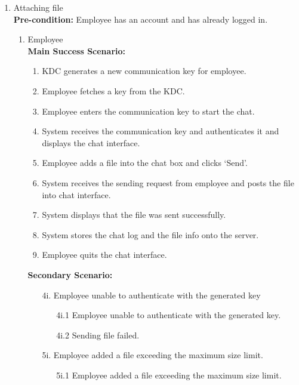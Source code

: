 \documentclass[]{article}
\begin{document}
\begin{enumerate}[{\bf BE1.}]
\begin{enumerate}[{\bf BE7.}]
	\item Attaching file  \\
        \textbf{Pre-condition:} Employee has an account and has already logged in.
		\begin{enumerate}[{\bf VP1.}]
			\item Employee \\
				\textbf{Main Success Scenario:}
                \begin{enumerate}[{  1.}]
                    \item KDC generates a new communication key for employee.
                    \item Employee fetches a key from the KDC.
                    \item Employee enters the communication key to start the chat. 
                    \item System receives the communication key and authenticates it and displays the chat interface.
                    \item Employee adds a file into the chat box and clicks ‘Send’.
                    \item System receives the sending request from employee and posts the file into chat interface. 
                    \item System displays that the file was sent successfully.
                    \item System stores the chat log and the file info onto the server.
                    \item Employee quits the chat interface.
                \end{enumerate}
                \textbf{Secondary Scenario:}
                \begin{enumerate}
                    \item[4i.] Employee unable to authenticate with the generated key 
                    \begin{enumerate}
                        \item[4i.1] Employee unable to authenticate with the generated key.
                        \item[4i.2] Sending file failed.
                    \end{enumerate}
                    \item[5i.] Employee added a file exceeding the maximum size limit.
                    \begin{enumerate}
                        \item[5i.1] Employee added a file exceeding the maximum size limit.

\end{enumerate}
\end{enumerate}
\end{enumerate}
\end{enumerate}
\end{enumerate}
\end{document}
